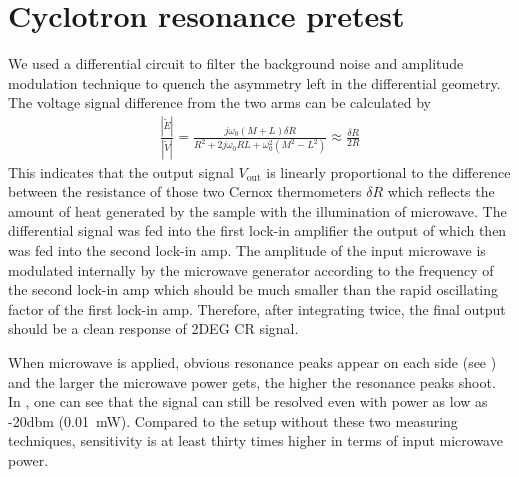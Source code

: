 \documentclass[12pt]{ruthesis}
\begin{document}
\section{Cyclotron resonance pretest}\label{Cyclotron}


 
We used a differential circuit to filter the background noise and amplitude modulation technique to quench the asymmetry left in the differential geometry.
The voltage signal difference from the two arms can be calculated by
\begin{align} 
\frac{|\tilde{E}|}{|\tilde{V}|}=\frac{j \omega_{0}(M+L)\delta R}{R^{2}+2j \omega_{0}RL + \omega_{0}^{2} (M^{2}-L^{2})} \approx \frac{\delta R}{2R}
\end{align} 
This indicates that the output signal $V_{\mathrm{out}}$ is linearly proportional to the difference between the resistance of those two Cernox thermometers $\delta R$ which reflects the amount of heat generated by the sample with the illumination of microwave.
The differential signal was fed into the first lock-in amplifier the output of which then was fed into the second lock-in amp. 
The amplitude of the input microwave is modulated internally by the microwave generator according to the frequency of the second lock-in amp which should be much smaller than the rapid oscillating factor of the first lock-in amp. 
Therefore, after integrating twice, the final output should be a clean response of 2DEG CR signal.     


When microwave is applied, obvious resonance peaks appear on each side (see ) and the larger the microwave power gets, the higher the resonance peaks shoot.
In , one can see that the signal can still be resolved even with power as low as -20dbm (\SI{0.01}{\milli \watt}). 
Compared to the setup without these two measuring techniques, sensitivity is at least thirty times higher in terms of input microwave power.  
\end{document}

